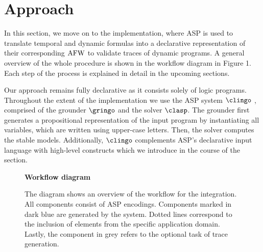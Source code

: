 \section{Approach  }\label{sec:approach}

In this section, we move on to the implementation, where ASP is used to translate temporal and dynamic formulas into a declarative representation of their corresponding $\mathrm{AFW}$ to validate traces of dynamic programs. A general overview of the whole procedure is shown in the workflow diagram in Figure 1. 
Each step of the process is explained in detail in the upcoming sections. 

Our approach remains fully declarative as it consists solely of logic programs.
Throughout the extent of the implementation we use the ASP system $\clingo$ \cite{gekakasc14a}, comprised of the grounder $\gringo$ and the solver $\clasp$. 
The grounder first generates a propositional representation of the input program by instantiating all variables, which are written using upper-case letters. Then, the solver computes the stable models. Additionally, $\clingo$ complements ASP’s declarative input language with high-level constructs which we introduce in the course of the section.


\begin{figure}[]
    \textbf{\large Workflow diagram}
    \centering
    

    
    

    


    \caption{The diagram shows an overview of the workflow for the integration. All components consist of ASP encodings. Components marked in dark blue are generated by the system. Dotted lines correspond to the inclusion of elements from the specific application domain. Lastly, the component in grey refers to the optional task of trace generation. }
    \label{workflow}
\end{figure}














